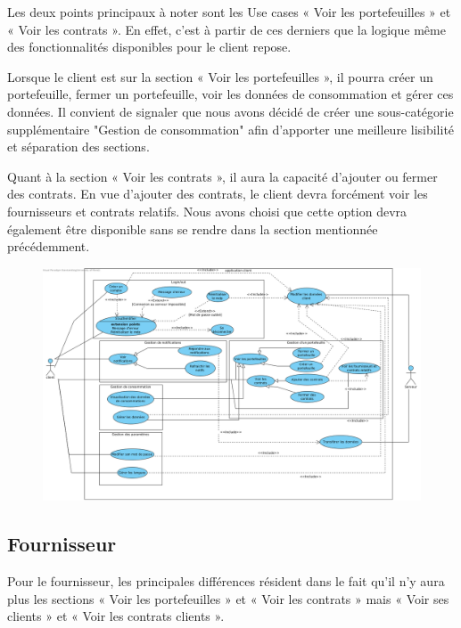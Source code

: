 Les deux points principaux à noter sont les Use cases « Voir les portefeuilles » et « Voir les contrats ». En effet, c’est à partir de ces derniers que la logique même des fonctionnalités disponibles pour le client repose.
\newline
\newline

Lorsque le client est sur la section « Voir les portefeuilles », il pourra créer un portefeuille, fermer un portefeuille, voir les données de consommation et gérer ces données.
Il convient de signaler que nous avons décidé de créer une sous-catégorie supplémentaire "Gestion de consommation" afin d'apporter une meilleure lisibilité et séparation des sections.
\newline
\newline

Quant à la section « Voir les contrats », il aura la capacité d’ajouter ou fermer des contrats. 
En vue d’ajouter des contrats, le client devra forcément voir les fournisseurs et contrats relatifs. Nous avons choisi que cette option devra également être disponible sans se rendre dans la section mentionnée précédemment.

\begin{figure}[h]
\centering
\includegraphics[width = 1\textwidth]{use_case/client.png}
\end{figure}

\newpage

\subsection{Fournisseur}

Pour le fournisseur, les principales différences résident dans le fait qu’il n’y aura plus les sections « Voir les portefeuilles » et « Voir les contrats » mais « Voir ses clients » et « Voir les contrats clients ».
\newline
\newline

